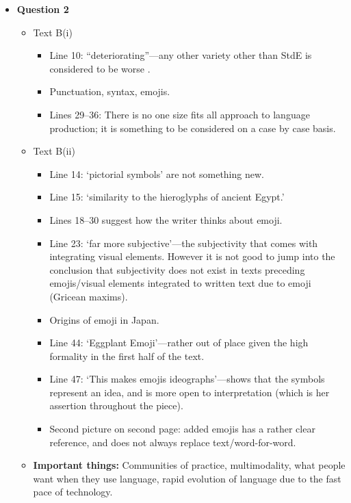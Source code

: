 \documentclass[../main.tex]{subfiles}
\begin{document}
\begin{itemize}
					\item \textbf{Question 2} \begin{itemize}
						\item Text B(i) \begin{itemize}
							\item Line 10: ``deteriorating''---any other variety other than StdE is considered to be worse .
							\item Punctuation, syntax, emojis.
							\item Lines 29--36: There is no one size fits all approach to language production; it is something to be considered on a case by case basis.
						\end{itemize}
						\item Text B(ii) \begin{itemize}
							\item Line 14: `pictorial symbols' are not something new.
							\item Line 15: `similarity to the hieroglyphs of ancient Egypt.'
							\item Lines 18--30 suggest how the writer thinks about emoji.
							\item Line 23: `far more subjective'---the subjectivity that comes with integrating visual elements. However it is not good to jump into the conclusion that subjectivity does not exist in texts preceding emojis/visual elements integrated to written text due to emoji (Gricean maxims).
							\item Origins of emoji in Japan.
							\item Line 44: `Eggplant Emoji'---rather out of place given the high formality in the first half of the text.
							\item Line 47: `This makes emojis ideographs'---shows that the symbols represent an idea, and is more open to interpretation (which is her assertion throughout the piece).
							\item Second picture on second page: added emojis has a rather clear reference, and does not always replace text/word-for-word.
						\end{itemize}
						\item \textbf{Important things:} Communities of practice, multimodality, what people want when they use language, rapid evolution of language due to the fast pace of technology.
					\end{itemize}
					

\end{itemize}
\end{document}

